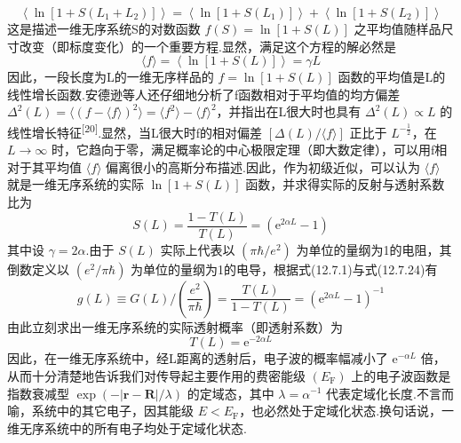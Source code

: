 \begin{equation}
  \left\langle\ln\left[1+S\left(L_{1}+L_{2}\right)\right]\right\rangle
  =\left\langle\ln\left[1+S\left(L_{1}\right)\right]\right\rangle
  +\left\langle\ln\left[1+S\left(L_{2}\right)\right]\right\rangle
\end{equation}
这是描述一维无序系统S的对数函数 $f\left(S\right)=\ln\left[1+S\left(L\right)\right]$ 之平均值随样品尺寸改变（即标度变化）的一个重要方程.显然，满足这个方程的解必然是
\begin{equation}
  \langle f\rangle=\left\langle\ln\left[1+S\left(L\right)\right]\right\rangle=\gamma L
\end{equation}
因此，一段长度为L的一维无序样品的 $f=\ln\left[1+S\left(L\right)\right]$ 函数的平均值是L的线性增长函数.安德逊等人还仔细地分析了f函数相对于平均值的均方偏差 $\Delta^{2}\left(L\right)=\langle\left(f-\langle f\rangle\right)^{2}\rangle=\langle f^{2}\rangle-\langle f\rangle^{2}$，并指出在L很大时也具有 $\Delta^{2}\left(L\right)\propto L$ 的线性增长特征\textsuperscript{[20]}.显然，当L很大时f的相对偏差 $\left[\Delta\left(L\right)/\langle f\rangle\right]$ 正比于 $L^{-\frac{1}{2}}$，在 $L\rightarrow\infty$ 时，它趋向于零，满足概率论的中心极限定理（即大数定律），可以用f相对于其平均值 $\langle f\rangle$ 偏离很小的高斯分布描述.因此，作为初级近似，可以认为 $\langle f\rangle$ 就是一维无序系统的实际 $\ln\left[1+S\left(L\right)\right]$ 函数，并求得实际的反射与透射系数比为
\begin{equation}
  S\left(L\right)=\frac{1-T\left(L\right)}{T\left(L\right)}
  =\left(\mathrm{e}^{2\alpha L}-1\right)
\end{equation}
其中设 $\gamma=2\alpha$.由于 $S\left(L\right)$ 实际上代表以 $\left(\pi\hbar/e^{2}\right)$ 为单位的量纲为1的电阻，其倒数定义以 $\left(e^{2}/\pi\hbar\right)$ 为单位的量纲为1的电导，根据式(12.7.1)与式(12.7.24)有
\begin{equation}
  g\left(L\right)\equiv G\left(L\right)/\left(\frac{e^{2}}{\pi\hbar}\right)
  =\frac{T\left(L\right)}{1-T\left(L\right)}
  =\left(\mathrm{e}^{2\alpha L}-1\right)^{-1}
\end{equation}
由此立刻求出一维无序系统的实际透射概率（即透射系数）为
\begin{equation}
  T\left(L\right)=\mathrm{e}^{-2\alpha L}
\end{equation}
因此，在一维无序系统中，经L距离的透射后，电子波的概率幅减小了 $\mathrm{e}^{-\alpha L}$ 倍，从而十分清楚地告诉我们对传导起主要作用的费密能级 $\left(E_{\mathrm{F}}\right)$ 上的电子波函数是指数衰减型 $\exp\left(-|\boldsymbol{r}-\boldsymbol{R}|/\lambda\right)$ 的定域态，其中 $\lambda=\alpha^{-1}$ 代表定域化长度.不言而喻，系统中的其它电子，因其能级 $E<E_{\mathrm{F}}$，也必然处于定域化状态.换句话说，一维无序系统中的所有电子均处于定域化状态.

